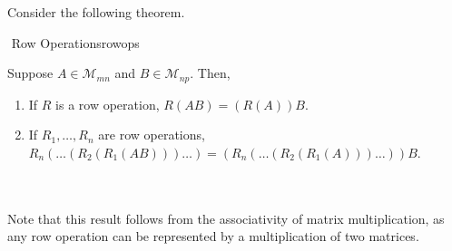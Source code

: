        \vphantom
        \\
        \\
        Consider the following theorem.
        \begin{theorem}{\Stop\,\,Row Operations}{rowops}
        
            Suppose \(A\in\mathcal{M}_{mn}\) and \(B\in\mathcal{M}_{np}\). Then,
            \begin{enumerate}
                \item If \(R\) is a row operation, \(R(AB)=(R(A))B\).
                \item If \(R_1,\ldots,R_n\) are row operations, \(R_n(
                \ldots(R_2(R_1(AB)))\ldots)=(R_n(\ldots(R_2(R_1(A)))\ldots))B\).
            \end{enumerate}
            \vphantom
            \\
            \\
            Note that this result follows from the associativity of matrix multiplication, as any row operation can be represented by a multiplication of two matrices.
        \end{theorem}
        
